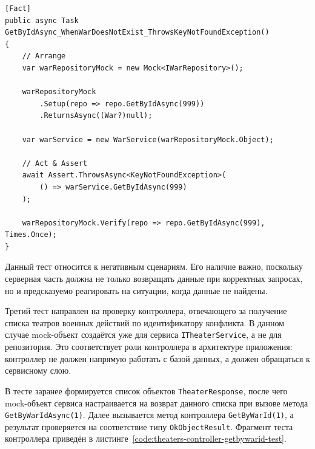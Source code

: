 \begin{code}
\label{code:war-service-getbyid-not-found-test}
\vspace{-0.75cm}
\begin{verbatim}
[Fact]
public async Task GetByIdAsync_WhenWarDoesNotExist_ThrowsKeyNotFoundException()
{
    // Arrange
    var warRepositoryMock = new Mock<IWarRepository>();

    warRepositoryMock
        .Setup(repo => repo.GetByIdAsync(999))
        .ReturnsAsync((War?)null);

    var warService = new WarService(warRepositoryMock.Object);

    // Act & Assert
    await Assert.ThrowsAsync<KeyNotFoundException>(
        () => warService.GetByIdAsync(999)
    );

    warRepositoryMock.Verify(repo => repo.GetByIdAsync(999), Times.Once);
}
\end{verbatim}
\end{code}

Данный тест относится к негативным сценариям. Его наличие важно, поскольку серверная часть должна не только возвращать данные при корректных запросах, но и предсказуемо реагировать на ситуации, когда данные не найдены.

Третий тест направлен на проверку контроллера, отвечающего за получение списка театров военных действий по идентификатору конфликта. В данном случае mock-объект создаётся уже для сервиса \texttt{ITheaterService}, а не для репозитория. Это соответствует роли контроллера в архитектуре приложения: контроллер не должен напрямую работать с базой данных, а должен обращаться к сервисному слою.

В тесте заранее формируется список объектов \texttt{TheaterResponse}, после чего mock-объект сервиса настраивается на возврат данного списка при вызове метода \texttt{GetByWarIdAsync(1)}. Далее вызывается метод контроллера \texttt{GetByWarId(1)}, а результат проверяется на соответствие типу \texttt{OkObjectResult}. Фрагмент теста контроллера приведён в листинге~\ref{code:theaters-controller-getbywarid-test}.

